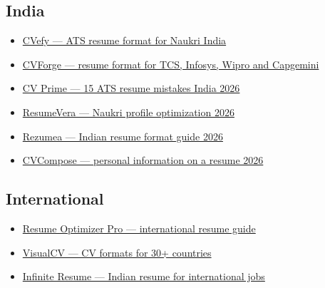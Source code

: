 \documentclass[11pt,a4paper]{article}
\begin{document}
\subsection*{India}
\begin{itemize}\setlength\itemsep{1pt}
  \item \href{https://cvefy.com/blog/ats-resume-format-naukri-india-guide}{CVefy --- ATS resume format for Naukri India}
  \item \href{https://www.cvforge.in/blog/resume-format-for-tcs-infosys-wipro}{CVForge --- resume format for TCS, Infosys, Wipro and Capgemini}
  \item \href{https://www.cv-prime.in/blog/ats-resume-mistakes}{CV Prime --- 15 ATS resume mistakes India 2026}
  \item \href{https://resumevera.com/guides/naukri-profile-optimization}{ResumeVera --- Naukri profile optimization 2026}
  \item \href{https://rezumea.com/resume-format/india}{Rezumea --- Indian resume format guide 2026}
  \item \href{https://cvcompose.com/us/blog/personal-information-resume-2026}{CVCompose --- personal information on a resume 2026}
\end{itemize}

\subsection*{International}
\begin{itemize}\setlength\itemsep{1pt}
  \item \href{https://resumeoptimizerpro.com/blog/understanding-international-resumes}{Resume Optimizer Pro --- international resume guide}
  \item \href{https://www.visualcv.com/blog/international-resume/}{VisualCV --- CV formats for 30+ countries}
  \item \href{https://www.infiniteresume.com/blog/indian-resume-international-jobs}{Infinite Resume --- Indian resume for international jobs}
\end{itemize}
\end{document}
